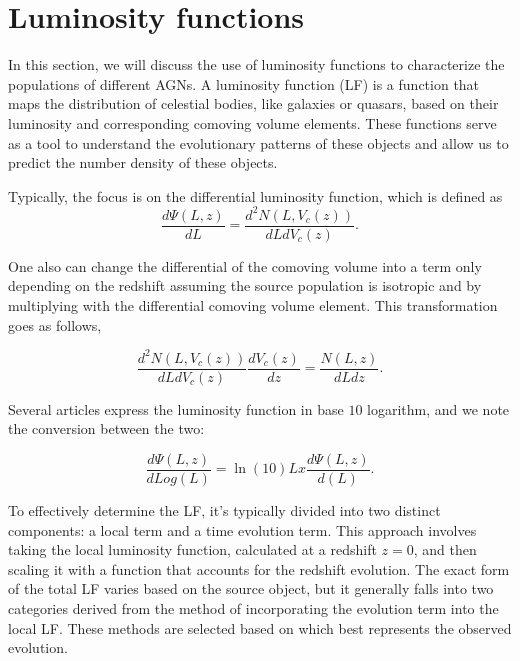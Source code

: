 \section{ Luminosity functions}
In this section, we will discuss the use of luminosity functions to characterize the populations of different AGNs. 
A luminosity function (LF) is a function that maps the distribution of celestial bodies, like galaxies or quasars,
based on their luminosity and corresponding comoving volume elements. These functions serve as a tool to understand the evolutionary patterns of these objects and allow us 
to predict the number density of these objects. 

Typically, the focus is on the differential luminosity function, which is defined as
\begin{equation}
    \frac{d\Psi(L,z)}{dL} = \frac{d^2N(L,V_c(z))}{dLdV_c(z)}.
\end{equation}

One also can change the differential of the comoving volume into a term only depending on the redshift assuming the source population is isotropic and by multiplying with the differential comoving volume element. This 
transformation goes as follows, 

\begin{equation}
    \frac{d^2N(L,V_c(z))}{dLdV_c(z)}\frac{dV_c(z)}{dz} = \frac{N(L,z)}{dLdz}.
\end{equation}


Several articles express the luminosity function in base $10$ logarithm, and we note the conversion between the two:


\begin{equation}
    \frac{d\Psi(L,z)}{dLog(L)} =  \ln (10)  Lx \frac{d\Psi(L,z)}{d(L)}.
\end{equation}


To effectively determine the LF, it's typically divided into two distinct components: a local term and a time evolution term.
 This approach involves taking the local luminosity function, calculated at a redshift 
$z=0$, and then scaling it with a function that accounts for the redshift evolution. 
The exact form of the total LF varies based on the source object, but it generally falls into two categories derived from the method of incorporating the evolution term into the local LF.
 These methods are selected based on which best represents the observed evolution.


